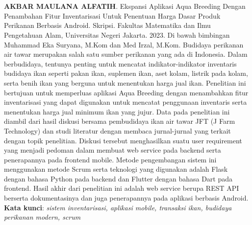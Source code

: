 \chapter*{}

\begin{spacing}{1}
\textbf{AKBAR MAULANA ALFATIH}. Ekspansi Aplikasi Aqua Breeding Dengan Penambahan Fitur Inventarisasi Untuk Penentuan Harga Dasar Produk Perikanan Berbasis Android. Skripsi. Fakultas Matematika dan Ilmu Pengetahuan Alam, Universitas Negeri Jakarta. 2023. Di bawah bimbingan Muhammad Eka Suryana, M.Kom dan Med Irzal, M.Kom.
\newline
\newline
Budidaya perikanan air tawar merupakan salah satu sumber perikanan yang ada di Indonesia. Dalam berbudidaya, tentunya penting untuk mencatat indikator-indikator inventaris budidaya ikan seperti pakan ikan, suplemen ikan, aset kolam, listrik pada kolam, serta benih ikan yang berguna untuk menentukan harga jual ikan. Penelitian ini bertujuan untuk  memperluas aplikasi Aqua Breeding dengan menambahkan fitur inventarisasi yang dapat digunakan untuk mencatat penggunaan inventaris serta menentukan harga jual minimum ikan yang jujur. Data pada penelitian ini diambil dari hasil diskusi bersama pembudidaya ikan air tawar JFT (J Farm Technology) dan studi literatur dengan membaca jurnal-jurnal yang terkait dengan topik penelitian. Diskusi tersebut menghasilkan suatu user requirement yang menjadi pedoman dalam membuat web service pada backend serta penerapannya pada frontend mobile. Metode pengembangan sistem ini menggunakan metode Scrum serta teknologi yang digunakan adalah Flask dengan bahasa Python pada backend dan Flutter dengan bahasa Dart pada frontend. Hasil akhir dari penelitian ini adalah web service berupa REST API berserta dokumentasinya dan juga penerapannya pada aplikasi berbasis Android.
\newline
\newline
\noindent \textbf{Kata kunci}: \textit{sistem inventarisasi, aplikasi mobile, transaksi ikan, budidaya perikanan modern, scrum}
\end{spacing}